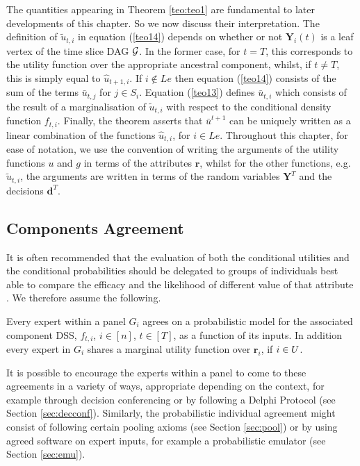 The quantities appearing in Theorem \ref{teo:teo1} are fundamental to later developments of this chapter. So we now discuss their interpretation. The definition of $\tilde{u}_{t,i}$ in equation (\ref{teo14}) depends on whether or not  $\bm{Y}_i(t)$ is a leaf vertex of the time slice  DAG $\mathcal{G}$.  In the former case, for $t=T$, this corresponds to the utility function over the appropriate ancestral component, whilst, if $t\neq T$, this is simply equal to $\hat{u}_{t+1,i}$. If $i\not\in Le$ then equation (\ref{teo14}) consists of the sum of the terms $\bar{u}_{t,j}$ for $j\in S_i$. Equation (\ref{teo13}) defines $\bar{u}_{t,i}$ which consists of the result of a marginalisation of $\tilde{u}_{t,i}$ with respect to the conditional density function $f_{t,i}$. Finally, the theorem asserts that $\bar{u}^{t+1}$ can be uniquely written as a linear combination of the functions $\hat{u}_{t,i}$, for $i\in Le$.  Throughout this chapter, for ease of notation, we use the convention of writing the arguments of the utility functions $u$ and $g$ in terms of the attributes $\bm{r}$, whilst for the other functions, e.g. $\tilde{u}_{t,i}$, the arguments are written in terms of the random variables $\bm{Y}^T$ and the decisions $\bm{d}^T$.

\subsection{Components Agreement}
It is often recommended that the evaluation of both the conditional utilities and the conditional probabilities should be delegated to groups of individuals best able to compare the efficacy and the likelihood of different value of that attribute \citep[see for example][]{VonNeumann2007,von1986}. We therefore assume the following.

\begin{assumption}
Every expert within a panel $G_i$ agrees on a probabilistic model for the associated component DSS,  $f_{t,i}$, $i\in[n]$, $t\in [T]$, as a function of its inputs. In addition every expert in $G_i$ shares  a marginal utility function over $\bm{r}_i$, if $i\in U$.
\label{strutass5}
\end{assumption}

It is possible to encourage the experts within a panel to come to these agreements in a variety of ways, appropriate depending on the context, for example through decision conferencing or  by following  a Delphi Protocol (see Section \ref{sec:decconf}). Similarly, the probabilistic individual agreement might consist of  following certain pooling axioms (see Section \ref{sec:pool}) or by using agreed  software on expert inputs,  for example a probabilistic emulator (see Section \ref{sec:emu}).

